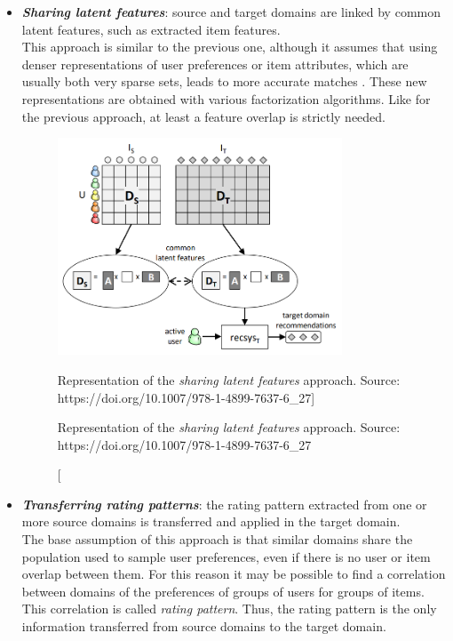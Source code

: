 \begin{itemize}
\begin{itemize}
\begin{figure}[hbt]
  \caption
  [Representation of the \textit{linking domains} approach. Source: https://doi.org/10.1007/978-1-4899-7637-6\_27]
  {\protect\raggedright Representation of the \textit{linking domains} approach. Source: https://doi.org/10.1007/978-1-4899-7637-6\_27}
\end{figure}
\item \textbf{\textit{Sharing latent features}}: source and target domains are linked by common latent features, such as extracted item features.\\
This approach is similar to the previous one, although it assumes that using denser representations of user preferences or item attributes, which are usually both very sparse sets, leads to more accurate matches \cite{10.5555/2283696.2283784, 10.5555/2898607.2898644}. These new representations are obtained with various factorization algorithms. Like for the previous approach, at least a feature overlap is strictly needed.
\begin{figure}[hbt]
  \centering
  \includegraphics[width=0.8\textwidth]{pictures/sharing-latent-features}
  \caption
  [Representation of the \textit{sharing latent features} approach. Source: https://doi.org/10.1007/978-1-4899-7637-6\_27]
  {\protect\raggedright Representation of the \textit{sharing latent features} approach. Source: https://doi.org/10.1007/978-1-4899-7637-6\_27}
\end{figure}
\item \textbf{\textit{Transferring rating patterns}}: the rating pattern extracted from one or more source domains is transferred and applied in the target domain.\\
The base assumption of this approach is that similar domains share the population used to sample user preferences, even if there is no user or item overlap between them. For this reason it may be possible to find a correlation between domains of the preferences of groups of users for groups of items. This correlation is called \textit{rating pattern}. Thus, the rating pattern is the only information transferred from source domains to the target domain.\\

\end{itemize}
\end{itemize}
